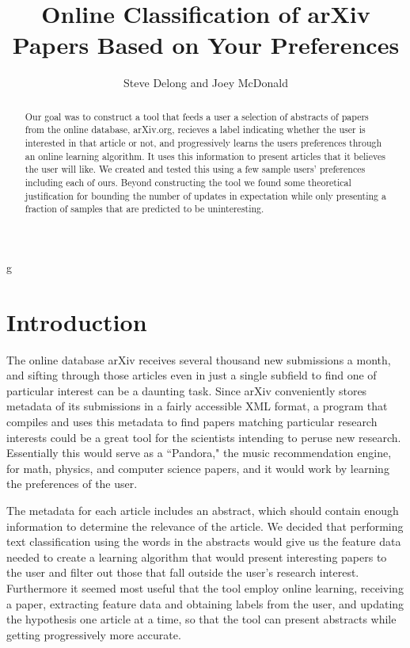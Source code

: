 g\documentclass[12pt]{article}
\begin{document}
\title{Online Classification of arXiv Papers Based on Your Preferences}
\author{Steve Delong and Joey McDonald}
\maketitle
\begin{abstract}
Our goal was to construct a tool that feeds a user a selection of abstracts of papers from the online database, arXiv.org, recieves a label indicating whether the user is interested in that article or not, and progressively learns the users preferences through an online learning algorithm. It uses this information to present articles that it believes the user will like. We created and tested this using a few sample users' preferences including each of ours. Beyond constructing the tool we found some theoretical justification for bounding the number of updates in expectation while only presenting a fraction of samples that are predicted to be uninteresting.
\end{abstract}

\section{Introduction}

The online database arXiv receives several thousand new submissions a month, and sifting through those articles even in just a single subfield to find one of particular interest can be a daunting task. Since arXiv conveniently stores metadata of its submissions in a fairly accessible XML format, a program that compiles and uses this metadata to find papers matching particular research interests could be a great tool for the scientists intending to peruse new research. Essentially this would serve as a ``Pandora," the music recommendation engine, for math, physics, and computer science papers, and it would work by learning the preferences of the user.

The metadata for each article includes an abstract, which should contain enough information to determine the relevance of the article. We decided that performing text classification using the words in the abstracts would give us the feature data needed to create a learning algorithm that would present interesting papers to the user and filter out those that fall outside the user's research interest. Furthermore it seemed most useful that the tool employ online learning, receiving a paper, extracting feature data and obtaining labels from the user, and updating the hypothesis one article at a time, so that the tool can present abstracts while getting progressively more accurate.
\end{document}
